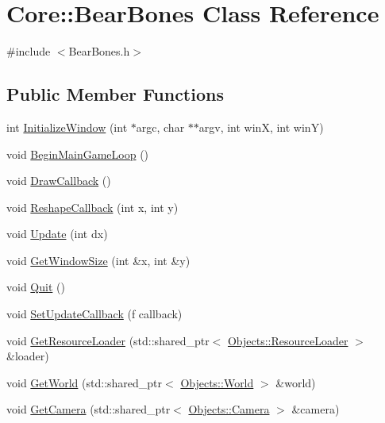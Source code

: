 \hypertarget{class_core_1_1_bear_bones}{}\section{Core\+:\+:Bear\+Bones Class Reference}
\label{class_core_1_1_bear_bones}


{\ttfamily \#include $<$Bear\+Bones.\+h$>$}

\subsection*{Public Member Functions}
\begin{DoxyCompactItemize}
\item 
int \hyperlink{class_core_1_1_bear_bones_a4023165c84d690ba6bade029bc60a710}{Initialize\+Window} (int $\ast$argc, char $\ast$$\ast$argv, int winX, int winY)
\item 
void \hyperlink{class_core_1_1_bear_bones_ad4258f21b446ccdc93f711bae6aae813}{Begin\+Main\+Game\+Loop} ()
\item 
void \hyperlink{class_core_1_1_bear_bones_aae597be3992d3095612317decd91a55d}{Draw\+Callback} ()
\item 
void \hyperlink{class_core_1_1_bear_bones_ad8ec7ea2b2e127f30fee7646359208e8}{Reshape\+Callback} (int x, int y)
\item 
void \hyperlink{class_core_1_1_bear_bones_a5d424aa025bfbefd266e7777c657ebd9}{Update} (int dx)
\item 
void \hyperlink{class_core_1_1_bear_bones_a369f24d6903dc2cfb5c766fbbfdcdfb8}{Get\+Window\+Size} (int \&x, int \&y)
\item 
void \hyperlink{class_core_1_1_bear_bones_a3e5b6f1994fdf8db744aba2f5a7547be}{Quit} ()
\item 
void \hyperlink{class_core_1_1_bear_bones_a980bca579db7dfbaebe2e8636660d0e2}{Set\+Update\+Callback} (f callback)
\item 
void \hyperlink{class_core_1_1_bear_bones_adf0f0c14fc729a3c7ac51297430b824d}{Get\+Resource\+Loader} (std\+::shared\+\_\+ptr$<$ \hyperlink{class_objects_1_1_resource_loader}{Objects\+::\+Resource\+Loader} $>$ \&loader)
\item 
void \hyperlink{class_core_1_1_bear_bones_af5f9add95ce3557aa9f045c55a61a760}{Get\+World} (std\+::shared\+\_\+ptr$<$ \hyperlink{class_objects_1_1_world}{Objects\+::\+World} $>$ \&world)
\item 
void \hyperlink{class_core_1_1_bear_bones_a4566808b082431ab19831dee7afd700b}{Get\+Camera} (std\+::shared\+\_\+ptr$<$ \hyperlink{class_objects_1_1_camera}{Objects\+::\+Camera} $>$ \&camera)
\end{DoxyCompactItemize}
